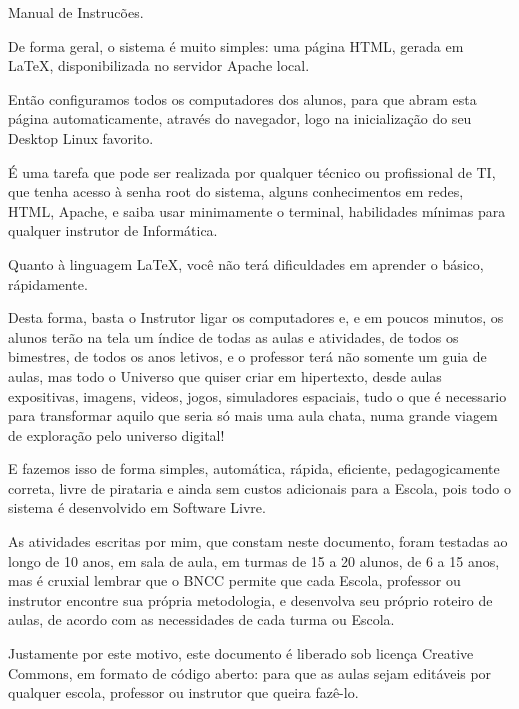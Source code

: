 
\LARGE Manual de Instrucões.

		\begin{multicols}{2}
	
	\normalsize	De forma geral, o sistema é muito simples: uma página HTML, gerada em \LaTeX, disponibilizada no servidor Apache local.
	
	
	Então configuramos todos os computadores dos alunos, para que abram esta página automaticamente, através do navegador, logo na inicialização do seu Desktop Linux favorito.
	
	É uma tarefa que pode ser realizada por qualquer técnico ou profissional de TI, que tenha acesso à senha root do sistema, alguns conhecimentos em redes, HTML, Apache, e saiba usar minimamente o terminal, habilidades mínimas para qualquer instrutor de Informática.
	
	Quanto à linguagem \LaTeX, você não terá dificuldades em aprender o básico, rápidamente.
	
	Desta forma, basta o Instrutor ligar os computadores e, e em poucos minutos, os alunos terão na tela um índice de todas as aulas e atividades, de todos  os bimestres, de todos os anos letivos, e o professor terá não somente um guia de aulas, mas todo o Universo que quiser criar em hipertexto, desde aulas expositivas, imagens, videos, jogos, simuladores espaciais, tudo o que é necessario para transformar aquilo que seria só mais uma aula chata, numa grande viagem de exploração pelo universo digital!
	
	E fazemos isso de forma simples, automática, rápida, eficiente, pedagogicamente correta, livre de pirataria e ainda sem custos adicionais para a Escola, pois todo o sistema é desenvolvido em Software Livre.
	
	As atividades escritas por mim, que constam neste documento, foram testadas ao longo de 10 anos, em sala de aula, em turmas de 15 a 20 alunos, de 6 a 15 anos, mas é cruxial lembrar que o BNCC permite que cada Escola, professor ou instrutor encontre sua própria metodologia, e desenvolva seu próprio roteiro de aulas, de acordo com as necessidades de cada turma ou Escola.
	
	Justamente por este motivo, este documento é liberado sob licença Creative Commons, em formato de código aberto: para que as aulas sejam editáveis por qualquer escola, professor ou instrutor que queira fazê-lo.
	

\end{multicols}
